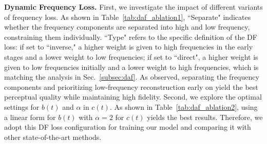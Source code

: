 \noindent
\textbf{Dynamic Frequency Loss.}
\label{ablation:daf}
First, we investigate the impact of different variants of frequency loss. As shown in Table~\ref{tab:daf_ablation1}, ``Separate" indicates whether the frequency components are separated into high and low frequency, constraining them individually. 
``Type" refers to the specific definition of the DF loss: if set to ``inverse," a higher weight is given to high frequencies in the early stages and a lower weight to low frequencies; if set to ``direct", a higher weight is given to low frequencies initially and a lower weight to high frequencies, which is matching the analysis in Sec.~\ref{subsec:daf}. As observed, separating the frequency components and prioritizing low-frequency reconstruction early on yield the best perceptual quality while maintaining high fidelity. Second, we explore the optimal settings for $b(t)$ and $\alpha$ in $c(t)$. As shown in Table~\ref{tab:daf_ablation2}, using a linear form for $b(t)$ with $\alpha=2$ for $c(t)$ yields the best results. Therefore, we adopt this DF loss configuration for training our model and comparing it with other state-of-the-art methods.



\begin{table}[t]
    \centering
    \caption{Effectiveness of T2V diffusion prior for real-world VSR.}
    \label{tab:t2v prior}
\end{table}
\vspace{-1mm}



